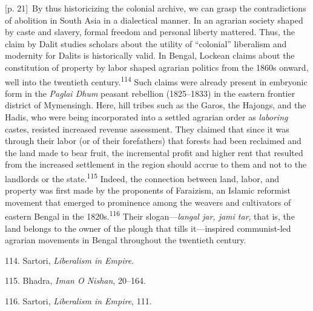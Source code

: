 \documentclass[10pt,a4paper]{article}
\begin{document}
{\scriptsize\color{gray} [p. 21]}\ By thus historicizing the colonial archive, we can grasp the contradictions of abolition in South Asia in a dialectical manner. In an agrarian society shaped by caste and slavery, formal freedom and personal liberty mattered. Thus, the claim by Dalit studies scholars about the utility of “colonial” liberalism and modernity for Dalits is historically valid. In Bengal, Lockean claims about the constitution of property by labor shaped agrarian politics from the 1860s onward, well into the twentieth century.\nobreak\textsuperscript{114} Such claims were already present in embryonic form in the \textit{Paglai Dhum} peasant rebellion (1825–1833) in the eastern frontier district of Mymensingh. Here, hill tribes such as the Garos, the Hajongs, and the Hadis, who were being incorporated into a settled agrarian order as \textit{laboring} castes, resisted increased revenue assessment. They claimed that since it was through their labor (or of their forefathers) that forests had been reclaimed and the land made to bear fruit, the incremental profit and higher rent that resulted from the increased settlement in the region should accrue to them and not to the landlords or the state.\nobreak\textsuperscript{115} Indeed, the connection between land, labor, and property was first made by the proponents of Faraizism, an Islamic reformist movement that emerged to prominence among the weavers and cultivators of eastern Bengal in the 1820s.\nobreak\textsuperscript{116} Their slogan—\textit{langal jar, jami tar}, that is, the land belongs to the owner of the plough that tills it—inspired communist-led agrarian movements in Bengal throughout the twentieth century.\par{\small 114. Sartori, \textit{Liberalism in Empire.}\par}{\small 115. Bhadra, \textit{Iman O Nishan}, 20–164.\par}{\small 116. Sartori, \textit{Liberalism in Empire}, 111.\par}
\end{document}

